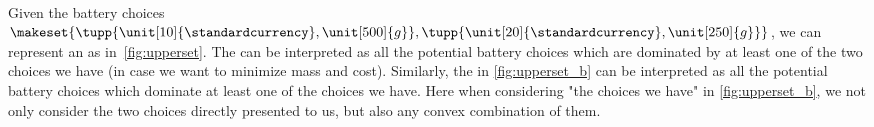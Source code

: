 \begin{marginfigure}
    \\
    \caption{}
\end{marginfigure}
%

Given the battery choices~$\makeset{\tupp{\unit[10]{\standardcurrency},\unit[500]{g}}, \tupp{\unit[20]{\standardcurrency},\unit[250]{g}}}$, we can represent an  as in~\cref{fig:upperset}.
The  can be interpreted as all the potential battery choices which are dominated by at least one of the two choices we have (in case we want to minimize mass and cost).
Similarly, the  in \cref{fig:upperset_b} can be interpreted as all the potential battery choices which dominate at least one of the choices we have.
Here when considering "the choices we have" in \cref{fig:upperset_b}, we not only consider the two choices directly presented to us, but also any convex combination of them.

